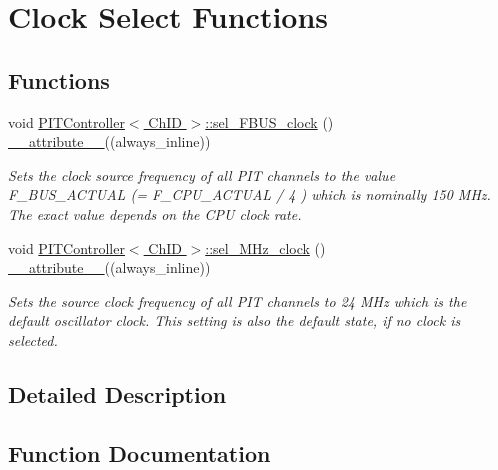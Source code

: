 \hypertarget{group__CLK}{}\section{\textquotesingle{}\textquotesingle{}Clock Select Functions\textquotesingle{}\textquotesingle{}}
\label{group__CLK}
\subsection*{Functions}
\begin{DoxyCompactItemize}
\item 
void \hyperlink{group__CLK_ga63e67e2ebfd6ceb5f5e38d9bd6a54754}{P\+I\+T\+Controller$<$ Ch\+I\+D $>$\+::sel\+\_\+\+F\+B\+U\+S\+\_\+clock} () \hyperlink{utilities_8hpp_a103d5b3998e0dd804213c8f30a094f4d}{\+\_\+\+\_\+attribute\+\_\+\+\_\+}((always\+\_\+inline))
\begin{DoxyCompactList}\small\item\em Sets the clock source frequency of all P\+IT channels to the value F\+\_\+\+B\+U\+S\+\_\+\+A\+C\+T\+U\+AL (= F\+\_\+\+C\+P\+U\+\_\+\+A\+C\+T\+U\+AL / 4 ) which is nominally 150 M\+Hz. The exact value depends on the C\+PU clock rate. \end{DoxyCompactList}\item 
void \hyperlink{group__CLK_gadb0d04fa23f4ebd20d2f495a86af3ccd}{P\+I\+T\+Controller$<$ Ch\+I\+D $>$\+::sel\+\_\+M\+Hz\+\_\+clock} () \hyperlink{utilities_8hpp_a103d5b3998e0dd804213c8f30a094f4d}{\+\_\+\+\_\+attribute\+\_\+\+\_\+}((always\+\_\+inline))
\begin{DoxyCompactList}\small\item\em Sets the source clock frequency of all P\+IT channels to 24 M\+Hz which is the default oscillator clock. This setting is also the default state, if no clock is selected. \end{DoxyCompactList}\end{DoxyCompactItemize}


\subsection{Detailed Description}


\subsection{Function Documentation}
\mbox{\label{group__CLK_gadb0d04fa23f4ebd20d2f495a86af3ccd}} 
